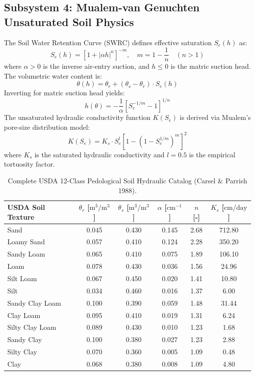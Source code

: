 \documentclass[11pt,a4paper]{article}
\theoremstyle{definition}
\theoremstyle{remark}
\begin{document}
\subsection{Subsystem 4: Mualem-van Genuchten Unsaturated Soil Physics}
The Soil Water Retention Curve (SWRC) defines effective saturation $S_e(h)$ as:
\begin{equation}
    S_e(h) = \left[1 + |\alpha h|^n\right]^{-m}, \quad m = 1 - \frac{1}{n} \quad (n > 1)
\end{equation}
where $\alpha > 0$ is the inverse air-entry suction, and $h \le 0$ is the matric suction head. The volumetric water content is:
\begin{equation}
    \theta(h) = \theta_r + (\theta_s - \theta_r) \cdot S_e(h)
\end{equation}
Inverting for matric suction head yields:
\begin{equation}
    h(\theta) = -\frac{1}{\alpha} \left[S_e^{-1/m} - 1\right]^{1/n}
\end{equation}
The unsaturated hydraulic conductivity function $K(S_e)$ is derived via Mualem's pore-size distribution model:
\begin{equation}
    K(S_e) = K_s \cdot S_e^l \left[1 - \left(1 - S_e^{1/m}\right)^m\right]^2
\end{equation}
where $K_s$ is the saturated hydraulic conductivity and $l = 0.5$ is the empirical tortuosity factor.

\begin{table}[h!]
\centering
\small
\begin{tabular}{lccccc}
\toprule
\textbf{USDA Soil Texture} & $\theta_r$ [$\text{m}^3/\text{m}^3$] & $\theta_s$ [$\text{m}^3/\text{m}^3$] & $\alpha$ [$\text{cm}^{-1}$] & $n$ [-] & $K_s$ [$\text{cm/day}$] \\
\midrule
Sand & 0.045 & 0.430 & 0.145 & 2.68 & 712.80 \\
Loamy Sand & 0.057 & 0.410 & 0.124 & 2.28 & 350.20 \\
Sandy Loam & 0.065 & 0.410 & 0.075 & 1.89 & 106.10 \\
Loam & 0.078 & 0.430 & 0.036 & 1.56 & 24.96 \\
Silt Loam & 0.067 & 0.450 & 0.020 & 1.41 & 10.80 \\
Silt & 0.034 & 0.460 & 0.016 & 1.37 & 6.00 \\
Sandy Clay Loam & 0.100 & 0.390 & 0.059 & 1.48 & 31.44 \\
Clay Loam & 0.095 & 0.410 & 0.019 & 1.31 & 6.24 \\
Silty Clay Loam & 0.089 & 0.430 & 0.010 & 1.23 & 1.68 \\
Sandy Clay & 0.100 & 0.380 & 0.027 & 1.23 & 2.88 \\
Silty Clay & 0.070 & 0.360 & 0.005 & 1.09 & 0.48 \\
Clay & 0.068 & 0.380 & 0.008 & 1.09 & 4.80 \\
\bottomrule
\end{tabular}
\caption{Complete USDA 12-Class Pedological Soil Hydraulic Catalog (Carsel \& Parrish 1988).}
\label{tab:usda_catalog}
\end{table}
\end{document}
